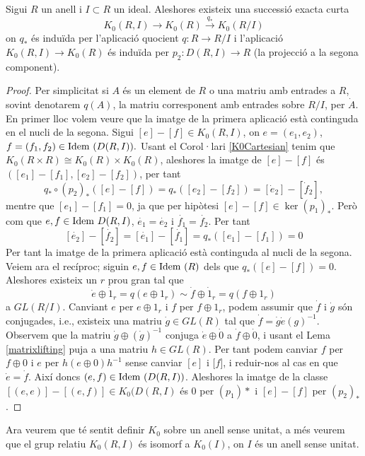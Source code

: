 \begin{theorem}\label{K0relatiuT}
Sigui $R$ un anell i $I\subset R$ un ideal. Aleshores existeix una successió exacta curta
$$
K_0(R,I) \rightarrow K_0(R) \xrightarrow{q_*} K_0(R/I)
$$
on $q_*$ és induïda per l'aplicació quocient $q:R\rightarrow R/I$ i l'aplicació $K_0(R,I) \rightarrow K_0(R)$ és induïda per $p_2: D(R,I)\rightarrow R$ (la projecció a la segona component).
\end{theorem}

\begin{proof}
Per simplicitat si $A$ és un element de $R$ o una matriu amb entrades a $R$, sovint denotarem $q(A)$, la matriu corresponent amb entrades sobre $R/I$, per $\dot{A}$. \\
En primer lloc volem veure que la imatge de la primera aplicació està continguda en el nucli de la segona. Sigui $[e]-[f]\in K_0(R,I)$, on $e=(e_1,e_2)$, $f=(f_1,f_2)\in \mathrm{Idem} \  (D(R,I)).$ 
Usant el Corol·lari \ref{K0Cartesian} tenim que $K_0(R\times R)\cong K_0(R)\times K_0(R)$, aleshores la imatge de $[e]-[f]$ és $([e_1]-[f_1],[e_2]-[f_2])$, per tant
$$
q_* \circ(p_2)_* ([e]-[f]) = q_* ([e_2]-[f_2])=[\dot{e}_2]-[\dot{f}_2],$$
mentre que $[e_1]-[f_1]=0$, ja que per hipòtesi $[e]-[f]\in \ker(p_1)_*$. Però com que $e,f\in \mathrm{Idem} \  D(R,I)$, $\dot{e_1}=\dot{e_2}$ i $\dot{f_1}=\dot{f_2}$. Per tant
$$
[\dot{e_2}]-[\dot{f_2}] =  [\dot{e_1}]-[\dot{f_1}] = q_*([e_1]-[f_1])=0
$$
Per tant la imatge de la primera aplicació està continguda al nucli de la segona. Veiem ara el recíproc; siguin $e,f\in \mathrm{Idem} \  (R)$ dels que $q_*([e]-[f])=0$. Aleshores existeix un $r$ prou gran tal que
$$
\dot{e} \oplus \dot{1}_r = q(e\oplus 1_r) \sim \dot{f} \oplus \dot{1}_r = q(f \oplus 1_r)
$$
a $GL(R/I)$. Canviant $e$ per $e \oplus 1_r$ i $f$ per $f \oplus 1_r$, podem assumir que $\dot{f}$ i $\dot{g}$ són conjugades, i.e., existeix una matriu $\dot{g}\in GL(R)$ tal que $\dot{f} = \dot{g} \dot{e} (g)^{-1}$. Observem que la matriu $\dot{g} \oplus (\dot{g})^{-1}$ conjuga $\dot{e}\oplus \dot{0}$ a $\dot{f}\oplus \dot{0}$, i usant el Lema \ref{matrixlifting} puja a una matriu $h\in GL(R)$. Per tant podem canviar $f$ per $f\oplus 0$ i $e$ per $h(e\oplus 0)h^{-1}$ sense canviar $[e]$ i $[f$], i reduir-nos al cas en que $\dot{e}=\dot{f}$. Així doncs $(e,f)\in \mathrm{Idem} \  (D(R,I))$. Aleshores la imatge de la classe $[(e,e)]-[(e,f)]\in K_0(D(R,I)$ és $0$ per $(p_1)*$ i $[e]-[f]$ per $(p_2)_*$.
\end{proof}

Ara veurem que té sentit definir $K_0$ sobre un anell sense unitat, a més veurem que el grup relatiu $K_0(R,I)$ és isomorf a $K_0(I)$, on $I$ és un anell sense unitat.

